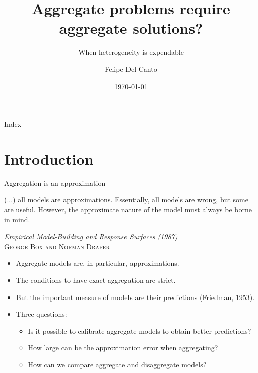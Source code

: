 \documentclass[10pt, handout]{beamer}
\title[]{Aggregate problems require aggregate solutions?}
\subtitle{When heterogeneity is expendable}
\author{Felipe Del Canto}
\institute[]{Pontificia Universidad Católica de Chile}
\date{\today}
\begin{document}

\begin{frame}{Index}
	\tableofcontents
\end{frame}

\section{Introduction}

\begin{frame}[t]{Aggregation is an approximation}
	\begin{center}
		\epigraph{\scriptsize (...) all models are approximations. Essentially, all models are wrong, but some are useful. However, %
the approximate nature of the model must always be borne in mind.}{\scriptsize\textit{Empirical Model-Building and Response Surfaces (1987)} \\\vspace{0.2ex} \textsc{George Box and Norman Draper}}
	\end{center} 

\pause \vfill
	\begin{itemize}
		\item Aggregate models are, in particular, approximations. \pause \vfill
		\item The conditions to have exact aggregation are strict. \pause \vfill
		\item But the important measure of models are their predictions (Friedman, 1953). \pause \vfill
		\item Three questions: \vspace{.5ex}
			\begin{itemize}
				\item Is it possible to calibrate aggregate models to obtain better predictions? \vspace{1ex}
				\item How large can be the approximation error when aggregating? \vspace{1ex}
				\item How can we compare aggregate and disaggregate models?
			\end{itemize}
			\vfill
	\end{itemize}
\end{frame}
\end{document}
